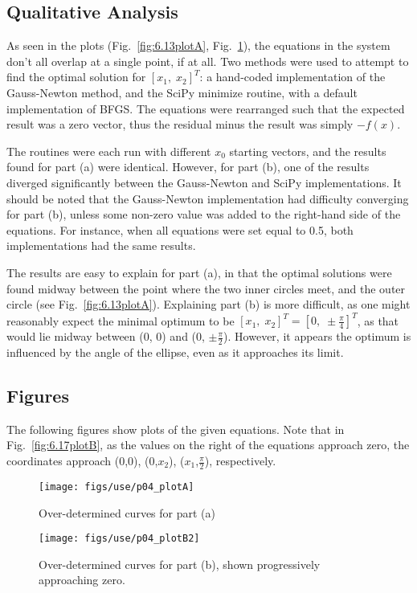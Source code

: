 \documentclass[paper=a4, fontsize=11pt]{scrartcl}
\numberwithin{equation}{section}		%
\numberwithin{figure}{section}			%
\numberwithin{table}{section}				%
\begin{document}
\subsection{Qualitative Analysis}
\par As seen in the plots (Fig.~\ref{fig:6.13plotA}, Fig.~\ref{fig:6.13plotB}), the equations in the system don't all overlap at a single point, if at all. Two methods were used to attempt to find the optimal solution for $[x_1, \; x_2]^T$: a hand-coded implementation of the Gauss-Newton method, and the SciPy minimize routine, with a default implementation of BFGS. The equations were rearranged such that the expected result was a zero vector, thus the residual minus the result was simply $-f(x)$. \\
\par The routines were each run with different $x_0$ starting vectors, and the results found for part (a) were identical. However, for part (b), one of the results diverged significantly between the Gauss-Newton and SciPy implementations. It should be noted that the Gauss-Newton implementation had difficulty converging for part (b), unless some non-zero value was added to the right-hand side of the equations. For instance, when all equations were set equal to 0.5, both implementations had the same results. \\
\par The results are easy to explain for part (a), in that the optimal solutions were found midway between the point where the two inner circles meet, and the outer circle (see Fig.~\ref{fig:6.13plotA}). Explaining part (b) is more difficult, as one might reasonably expect the minimal optimum to be $[x_1, \; x_2]^T = [0, \; \pm \frac{\pi}{4}]^T$, as that would lie midway between (0, 0) and (0, $\pm \frac{\pi}{2}$). However, it appears the optimum is influenced by the angle of the ellipse, even as it approaches its limit. \\


\vspace{4mm}
\subsection{Figures}
\par The following figures show plots of the given equations. Note that in Fig.~\ref{fig:6.17plotB}, as the values on the right of the equations approach zero, the coordinates approach (0,0), (0,$x_2$), ($x_1$,$\frac{\pi}{2}$), respectively. \\
\begin{figure}[!hbt]
		\texttt{[image: figs/use/p04\_plotA]}
		\caption{Over-determined curves for part (a)}
		\label{fig:6.13plotA}
	\endminipage\hfill
		\texttt{[image: figs/use/p04\_plotB2]}
		\caption{Over-determined curves for part (b), shown progressively approaching zero.}
		\label{fig:6.13plotB}
	\endminipage\hfill
\end{figure}
\end{document}
